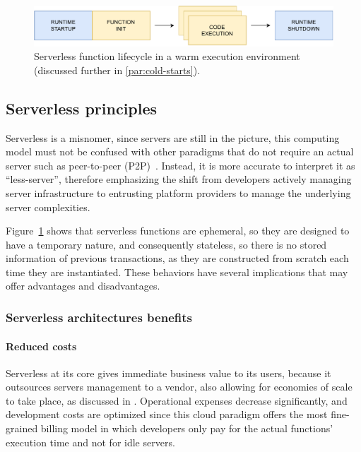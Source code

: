 \begin{figure}[H]
  \centering
  \includegraphics[width=\textwidth]{diagrams/lambda}
  \caption{Serverless function lifecycle in a warm execution environment (discussed further in \cref{par:cold-starts}).}
  \label{fig:serverless-functions-lifecycle}
\end{figure}

\subsection{Serverless principles}

Serverless is a misnomer, since servers are still in the picture,
this computing model must not be confused with other paradigms
that do not require an actual server such as peer-to-peer (P2P)~\cite{serverless-wikipedia}.
Instead, it is more accurate to interpret it as ``less-server'',
therefore emphasizing the shift from developers actively
managing server infrastructure to entrusting platform providers to manage the underlying server complexities.

Figure~\ref{fig:serverless-functions-lifecycle} shows that serverless functions
are ephemeral, so they are designed to have a temporary nature, and consequently
stateless, so there is no stored information of previous transactions, as they are constructed
from scratch each time they are instantiated.
These behaviors have several implications that may offer advantages and disadvantages.

\subsubsection{Serverless architectures benefits}

\paragraph{\textbf{Reduced costs}} Serverless at its core gives immediate
business value to its users, because it outsources servers management
to a vendor, also allowing for economies of scale to take place, as discussed in \cite{berkeley}.
Operational expenses decrease significantly, and development costs are optimized
since this cloud paradigm offers the most fine-grained billing model in which developers
only pay for the actual functions' execution time and not for idle servers.

